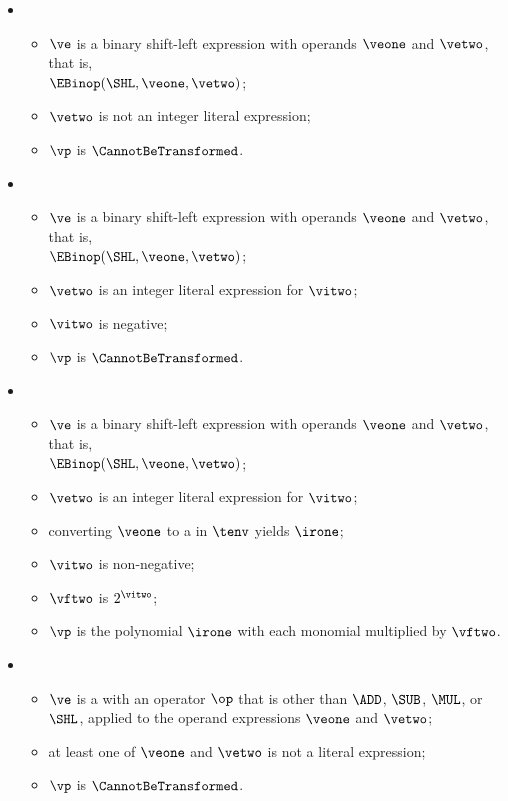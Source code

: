 \begin{itemize}
  \item {}
  \begin{itemize}
    \item $\ve$ is a binary shift-left expression with operands $\veone$ and $\vetwo$, that is, \\ $\EBinop(\SHL, \veone, \vetwo)$;
    \item $\vetwo$ is not an integer literal expression;
    \item $\vp$ is $\CannotBeTransformed$.
  \end{itemize}

  \item {}
  \begin{itemize}
    \item $\ve$ is a binary shift-left expression with operands $\veone$ and $\vetwo$, that is, \\ $\EBinop(\SHL, \veone, \vetwo)$;
    \item $\vetwo$ is an integer literal expression for $\vitwo$;
    \item $\vitwo$ is negative;
    \item $\vp$ is $\CannotBeTransformed$.
  \end{itemize}

  \item {}
  \begin{itemize}
    \item $\ve$ is a binary shift-left expression with operands $\veone$ and $\vetwo$, that is, \\ $\EBinop(\SHL, \veone, \vetwo)$;
    \item $\vetwo$ is an integer literal expression for $\vitwo$;
    \item converting $\veone$ to a \symbolicexpressionterm{} in $\tenv$ yields $\irone$\ProseOrTypeErrorOrCannotBeTransformed;
    \item $\vitwo$ is non-negative;
    \item $\vftwo$ is $2^{\vitwo}$;
    \item $\vp$ is the polynomial $\irone$ with each monomial multiplied by $\vftwo$.
  \end{itemize}

  \item {}
  \begin{itemize}
    \item $\ve$ is a \binopexpressionterm{} with an operator $\op$ that is other than $\ADD$, $\SUB$, $\MUL$, or $\SHL$,
          applied to the operand expressions $\veone$ and $\vetwo$;
    \item at least one of $\veone$ and $\vetwo$ is not a literal expression;
    \item $\vp$ is $\CannotBeTransformed$.
  \end{itemize}


\end{itemize}
